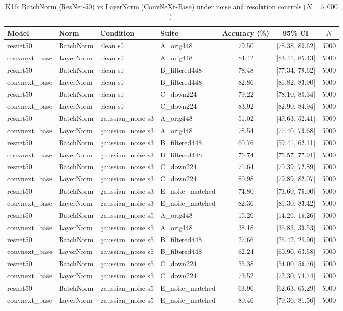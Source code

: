 \begin{table}[t]
\centering
\caption{K16: BatchNorm (ResNet-50) vs LayerNorm (ConvNeXt-Base) under noise and resolution controls ($N=5{,}000$).}
\label{tab:k16_bn_vs_ln}
\small
\begin{tabular}{llllccc}
\toprule
Model & Norm & Condition & Suite & Accuracy (\%) & 95\% CI & $N$ \\
\midrule
resnet50 & BatchNorm & clean s0 & A_orig448 & 79.50 & [78.38, 80.62] & 5000 \\
convnext_base & LayerNorm & clean s0 & A_orig448 & 84.42 & [83.41, 85.43] & 5000 \\
resnet50 & BatchNorm & clean s0 & B_filtered448 & 78.48 & [77.34, 79.62] & 5000 \\
convnext_base & LayerNorm & clean s0 & B_filtered448 & 82.86 & [81.82, 83.90] & 5000 \\
resnet50 & BatchNorm & clean s0 & C_down224 & 79.22 & [78.10, 80.34] & 5000 \\
convnext_base & LayerNorm & clean s0 & C_down224 & 83.92 & [82.90, 84.94] & 5000 \\
resnet50 & BatchNorm & gaussian_noise s3 & A_orig448 & 51.02 & [49.63, 52.41] & 5000 \\
convnext_base & LayerNorm & gaussian_noise s3 & A_orig448 & 78.54 & [77.40, 79.68] & 5000 \\
resnet50 & BatchNorm & gaussian_noise s3 & B_filtered448 & 60.76 & [59.41, 62.11] & 5000 \\
convnext_base & LayerNorm & gaussian_noise s3 & B_filtered448 & 76.74 & [75.57, 77.91] & 5000 \\
resnet50 & BatchNorm & gaussian_noise s3 & C_down224 & 71.64 & [70.39, 72.89] & 5000 \\
convnext_base & LayerNorm & gaussian_noise s3 & C_down224 & 80.98 & [79.89, 82.07] & 5000 \\
resnet50 & BatchNorm & gaussian_noise s3 & E_noise_matched & 74.80 & [73.60, 76.00] & 5000 \\
convnext_base & LayerNorm & gaussian_noise s3 & E_noise_matched & 82.36 & [81.30, 83.42] & 5000 \\
resnet50 & BatchNorm & gaussian_noise s5 & A_orig448 & 15.26 & [14.26, 16.26] & 5000 \\
convnext_base & LayerNorm & gaussian_noise s5 & A_orig448 & 38.18 & [36.83, 39.53] & 5000 \\
resnet50 & BatchNorm & gaussian_noise s5 & B_filtered448 & 27.66 & [26.42, 28.90] & 5000 \\
convnext_base & LayerNorm & gaussian_noise s5 & B_filtered448 & 62.24 & [60.90, 63.58] & 5000 \\
resnet50 & BatchNorm & gaussian_noise s5 & C_down224 & 55.38 & [54.00, 56.76] & 5000 \\
convnext_base & LayerNorm & gaussian_noise s5 & C_down224 & 73.52 & [72.30, 74.74] & 5000 \\
resnet50 & BatchNorm & gaussian_noise s5 & E_noise_matched & 63.96 & [62.63, 65.29] & 5000 \\
convnext_base & LayerNorm & gaussian_noise s5 & E_noise_matched & 80.46 & [79.36, 81.56] & 5000 \\
\bottomrule
\end{tabular}
\end{table}